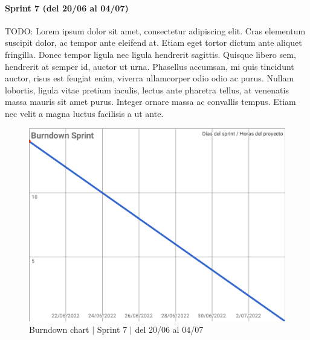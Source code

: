 \paragraph{Sprint 7 (del 20/06 al 04/07)}
TODO: Lorem ipsum dolor sit amet, consectetur adipiscing elit. Cras elementum suscipit dolor, ac tempor ante eleifend at. Etiam eget tortor dictum ante aliquet fringilla. Donec tempor ligula nec ligula hendrerit sagittis. Quisque libero sem, hendrerit at semper id, auctor ut urna. Phasellus accumsan, mi quis tincidunt auctor, risus est feugiat enim, viverra ullamcorper odio odio ac purus. Nullam lobortis, ligula vitae pretium iaculis, lectus ante pharetra tellus, at venenatis massa mauris sit amet purus. Integer ornare massa ac convallis tempus. Etiam nec velit a magna luctus facilisis a ut ante.
\begin{figure}[H]
    \centering
    \includegraphics[width=1\linewidth]{text/image/BurndownChart7.pdf}
    \caption{Burndown chart $|$ Sprint 7 $|$ del 20/06 al 04/07}
    \label{fig:burndown_chart_7}
\end{figure}

\newpage

